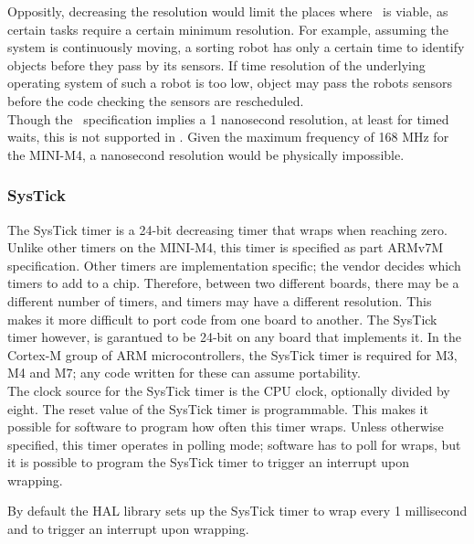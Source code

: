 Oppositly, decreasing the resolution would limit the places where \OSname\ is
viable, as certain tasks require a certain minimum resolution. For example,
assuming the system is continuously moving, a sorting robot has only a certain
time to identify objects before they pass by its sensors. If time resolution of 
the underlying operating system of such a robot is too low, object may pass the
robots sensors before the code checking the sensors are rescheduled.\\

Though the \arinc\ specification implies a 1 nanosecond resolution, at least for
timed waits, this is not supported in \OSname . Given the maximum frequency of
168 MHz for the MINI-M4, a nanosecond resolution would be physically impossible.

\subsubsection{SysTick}
The SysTick timer is a 24-bit decreasing timer that wraps when reaching zero.
Unlike other timers on the MINI-M4, this timer is specified as part ARMv7M
specification. Other timers are implementation specific; the vendor decides
which timers to add to a chip. Therefore, between two different boards, there
may be a different number of timers, and timers may have a different resolution.
This makes it more difficult to port code from one board to another. The SysTick
timer however, is garantued to be 24-bit on any board that implements it. In the
Cortex-M group of ARM microcontrollers, the SysTick timer is required for M3, M4
and M7; any code written for these can assume portability.\\

The clock source for the SysTick timer is the CPU clock, optionally divided by
eight. The reset value of the SysTick timer is programmable. This makes it
possible for software to program how often this timer wraps.
Unless otherwise specified, this timer operates in polling mode; software has to
poll for wraps, but it is possible to program the SysTick timer to trigger an 
interrupt upon wrapping.

By default the HAL library sets up the SysTick timer to wrap every 1 millisecond
and to trigger an interrupt upon wrapping. 

